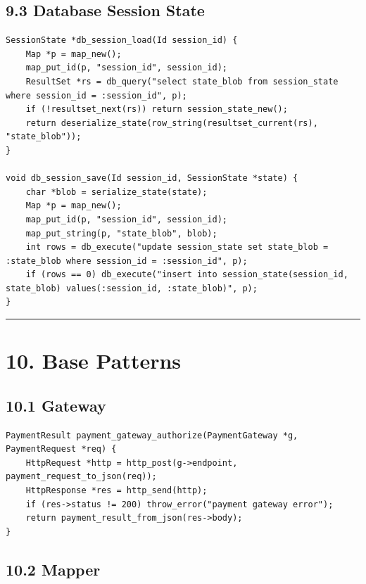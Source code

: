 \documentclass[11pt]{article}
\begin{document}
\subsection{9.3 Database Session State}\label{database-session-state}

\begin{verbatim}
SessionState *db_session_load(Id session_id) {
    Map *p = map_new();
    map_put_id(p, "session_id", session_id);
    ResultSet *rs = db_query("select state_blob from session_state where session_id = :session_id", p);
    if (!resultset_next(rs)) return session_state_new();
    return deserialize_state(row_string(resultset_current(rs), "state_blob"));
}

void db_session_save(Id session_id, SessionState *state) {
    char *blob = serialize_state(state);
    Map *p = map_new();
    map_put_id(p, "session_id", session_id);
    map_put_string(p, "state_blob", blob);
    int rows = db_execute("update session_state set state_blob = :state_blob where session_id = :session_id", p);
    if (rows == 0) db_execute("insert into session_state(session_id, state_blob) values(:session_id, :state_blob)", p);
}
\end{verbatim}

\begin{center}\rule{0.5\linewidth}{0.5pt}\end{center}

\section{10. Base Patterns}\label{base-patterns}

\subsection{10.1 Gateway}\label{gateway}

\begin{verbatim}
PaymentResult payment_gateway_authorize(PaymentGateway *g, PaymentRequest *req) {
    HttpRequest *http = http_post(g->endpoint, payment_request_to_json(req));
    HttpResponse *res = http_send(http);
    if (res->status != 200) throw_error("payment gateway error");
    return payment_result_from_json(res->body);
}
\end{verbatim}

\subsection{10.2 Mapper}\label{mapper}
\end{document}

